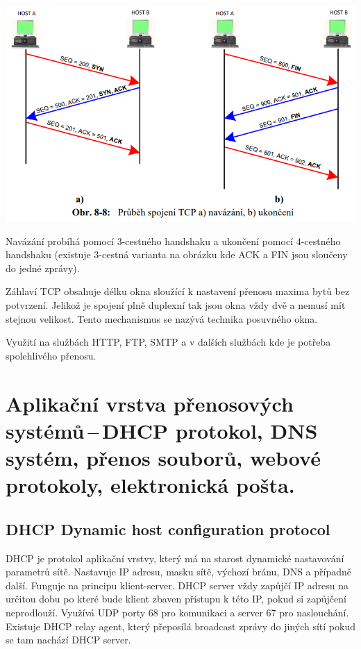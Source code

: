 \begin{center}
\includegraphics[scale = 0.5]{images/-052.png}
\end{center}

Navázání probíhá pomocí 3-cestného handshaku a ukončení pomocí 4-cestného handshaku (existuje 3-cestná varianta na obrázku kde ACK a FIN jsou sloučeny do jedné zprávy). 

Záhlaví TCP obsahuje délku okna sloužící k nastavení přenosu maxima bytů bez potvrzení. Jelikož je spojení plně duplexní tak jsou okna vždy dvě a nemusí mít stejnou velikost. Tento mechanismus se nazývá technika posuvného okna. 

Využití na službách HTTP, FTP, SMTP a v dalších službách kde je potřeba spolehlivého přenosu.

\clearpage
\section{Aplikační vrstva přenosových systémů\,--\,DHCP protokol, DNS systém, přenos souborů, webové protokoly, elektronická pošta.}

\subsection{DHCP Dynamic host configuration protocol}

DHCP je protokol aplikační vrstvy, který má na starost dynamické nastavování parametrů sítě. Nastavuje IP adresu, masku sítě, výchozí bránu, DNS a případně další. Funguje na principu klient-server. DHCP server vždy zapůjčí IP adresu na určitou dobu po které bude klient zbaven přístupu k této IP, pokud si zapůjčení neprodlouží. Využívá UDP porty 68 pro komunikaci a server 67 pro naslouchání. Existuje DHCP relay agent, který přeposílá broadcast zprávy do jiných sítí pokud se tam nachází DHCP server.

